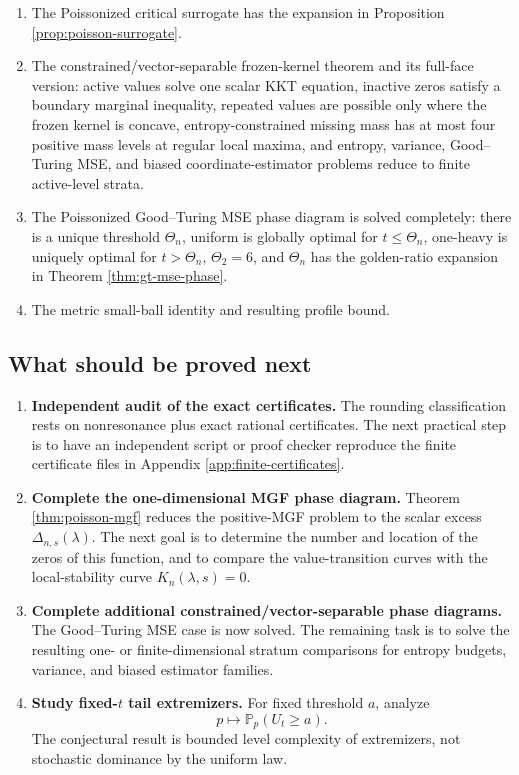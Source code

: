 \documentclass[11pt]{article}
\theoremstyle{definition}
\newcommand{\Pp}{\mathbb P}
\begin{document}
\begin{enumerate}[label=\textbf{P\arabic*.}]
\item The Poissonized critical surrogate has the expansion in Proposition \ref{prop:poisson-surrogate}.
\item The constrained/vector-separable frozen-kernel theorem and its full-face version: active values solve one scalar KKT equation, inactive zeros satisfy a boundary marginal inequality, repeated values are possible only where the frozen kernel is concave, entropy-constrained missing mass has at most four positive mass levels at regular local maxima, and entropy, variance, Good--Turing MSE, and biased coordinate-estimator problems reduce to finite active-level strata.
\item The Poissonized Good--Turing MSE phase diagram is solved completely: there is a unique threshold $\Theta_n$, uniform is globally optimal for $t\le\Theta_n$, one-heavy is uniquely optimal for $t>\Theta_n$, $\Theta_2=6$, and $\Theta_n$ has the golden-ratio expansion in Theorem \ref{thm:gt-mse-phase}.
\item The metric small-ball identity and resulting profile bound.
\end{enumerate}



\subsection{What should be proved next}

\begin{enumerate}[label=\textbf{N\arabic*.}]
\item \textbf{Independent audit of the exact certificates.}  The rounding classification rests on nonresonance plus exact rational certificates.  The next practical step is to have an independent script or proof checker reproduce the finite certificate files in Appendix \ref{app:finite-certificates}.

\item \textbf{Complete the one-dimensional MGF phase diagram.} Theorem \ref{thm:poisson-mgf} reduces the positive-MGF problem to the scalar excess $\Delta_{n,s}(\lambda)$.  The next goal is to determine the number and location of the zeros of this function, and to compare the value-transition curves with the local-stability curve $K_n(\lambda,s)=0$.

\item \textbf{Complete additional constrained/vector-separable phase diagrams.} The Good--Turing MSE case is now solved.  The remaining task is to solve the resulting one- or finite-dimensional stratum comparisons for entropy budgets, variance, and biased estimator families.

\item \textbf{Study fixed-$t$ tail extremizers.} For fixed threshold $a$, analyze
\[
  p\mapsto \Pp_p(U_t\ge a).
\]
The conjectural result is bounded level complexity of extremizers, not stochastic dominance by the uniform law.
\end{enumerate}
\end{document}
